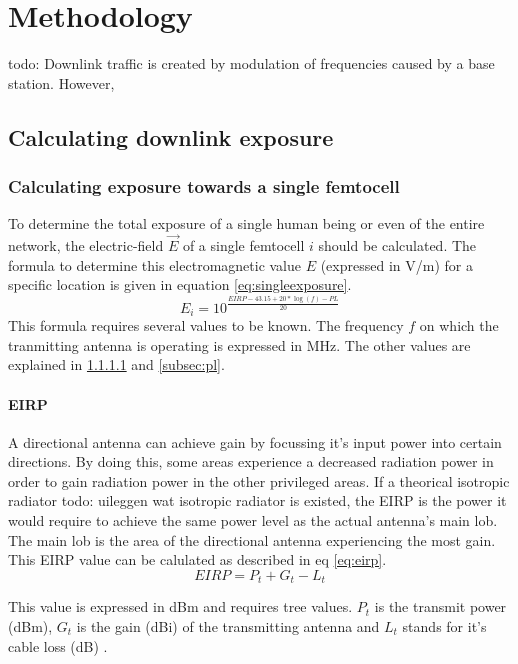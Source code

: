 \chapter{Methodology}
\label{chap:deploymenttool}
todo: Downlink traffic is created by modulation of frequencies caused by a base station. However, 
 
\section{Calculating downlink exposure}
\subsection{Calculating exposure towards a single femtocell}
\label{sec:calculatingexposure}
To determine the total exposure of a single human being or even of the entire network, the electric-field $\vec{E}$ of a single femtocell $i$ should be calculated.
The formula to determine this electromagnetic value $E$ (expressed in V/m) for a specific location is given in equation \ref{eq:singleexposure}.
\begin{equation}
E_i = 10^{\frac{EIRP - 43.15 + 20*\log(f)- PL}{20}}
\label{eq:singleexposure}
\end{equation}
This formula requires several values to be known. The frequency $f$ on which the tranmitting antenna is operating is expressed in MHz. The other values are explained in \ref{subsec:eirp} and \ref{subsec:pl}.

\subsubsection{EIRP}
\label{subsec:eirp}

A directional antenna can achieve gain by focussing it's input power into certain directions. By doing this, some areas experience a decreased radiation power in order to gain radiation power 
in the other privileged areas. If a theorical isotropic radiator \color{red}todo: uileggen wat isotropic radiator is\color{black} existed, the \gls{EIRP} is the power it would require to achieve the same power level as the actual antenna's main lob. The main lob is the area of the directional antenna experiencing the most gain.
This \gls{EIRP} value can be calulated as described in eq \ref{eq:eirp}.
\begin{equation}
EIRP = P_t + G_t - L_t
\label{eq:eirp}
\end{equation}

This value is expressed in dBm and requires tree values. $P_t$ is the transmit power (dBm), $G_t$ is the gain (dBi) of the transmitting antenna and $L_t$ stands for it's cable loss (dB) \cite{howToCalculateEIRP}.

